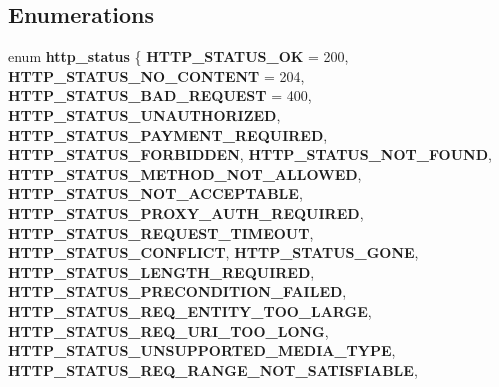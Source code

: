 \subsection*{Enumerations}
\begin{DoxyCompactItemize}
\item 
\mbox{\label{group__html-chunked-substitution_gabc3b93f68c8bdd857ad32913628dfa8d}} 
enum {\bfseries http\+\_\+status} \{ \newline
{\bfseries H\+T\+T\+P\+\_\+\+S\+T\+A\+T\+U\+S\+\_\+\+OK} = 200, 
{\bfseries H\+T\+T\+P\+\_\+\+S\+T\+A\+T\+U\+S\+\_\+\+N\+O\+\_\+\+C\+O\+N\+T\+E\+NT} = 204, 
{\bfseries H\+T\+T\+P\+\_\+\+S\+T\+A\+T\+U\+S\+\_\+\+B\+A\+D\+\_\+\+R\+E\+Q\+U\+E\+ST} = 400, 
{\bfseries H\+T\+T\+P\+\_\+\+S\+T\+A\+T\+U\+S\+\_\+\+U\+N\+A\+U\+T\+H\+O\+R\+I\+Z\+ED}, 
\newline
{\bfseries H\+T\+T\+P\+\_\+\+S\+T\+A\+T\+U\+S\+\_\+\+P\+A\+Y\+M\+E\+N\+T\+\_\+\+R\+E\+Q\+U\+I\+R\+ED}, 
{\bfseries H\+T\+T\+P\+\_\+\+S\+T\+A\+T\+U\+S\+\_\+\+F\+O\+R\+B\+I\+D\+D\+EN}, 
{\bfseries H\+T\+T\+P\+\_\+\+S\+T\+A\+T\+U\+S\+\_\+\+N\+O\+T\+\_\+\+F\+O\+U\+ND}, 
{\bfseries H\+T\+T\+P\+\_\+\+S\+T\+A\+T\+U\+S\+\_\+\+M\+E\+T\+H\+O\+D\+\_\+\+N\+O\+T\+\_\+\+A\+L\+L\+O\+W\+ED}, 
\newline
{\bfseries H\+T\+T\+P\+\_\+\+S\+T\+A\+T\+U\+S\+\_\+\+N\+O\+T\+\_\+\+A\+C\+C\+E\+P\+T\+A\+B\+LE}, 
{\bfseries H\+T\+T\+P\+\_\+\+S\+T\+A\+T\+U\+S\+\_\+\+P\+R\+O\+X\+Y\+\_\+\+A\+U\+T\+H\+\_\+\+R\+E\+Q\+U\+I\+R\+ED}, 
{\bfseries H\+T\+T\+P\+\_\+\+S\+T\+A\+T\+U\+S\+\_\+\+R\+E\+Q\+U\+E\+S\+T\+\_\+\+T\+I\+M\+E\+O\+UT}, 
{\bfseries H\+T\+T\+P\+\_\+\+S\+T\+A\+T\+U\+S\+\_\+\+C\+O\+N\+F\+L\+I\+CT}, 
\newline
{\bfseries H\+T\+T\+P\+\_\+\+S\+T\+A\+T\+U\+S\+\_\+\+G\+O\+NE}, 
{\bfseries H\+T\+T\+P\+\_\+\+S\+T\+A\+T\+U\+S\+\_\+\+L\+E\+N\+G\+T\+H\+\_\+\+R\+E\+Q\+U\+I\+R\+ED}, 
{\bfseries H\+T\+T\+P\+\_\+\+S\+T\+A\+T\+U\+S\+\_\+\+P\+R\+E\+C\+O\+N\+D\+I\+T\+I\+O\+N\+\_\+\+F\+A\+I\+L\+ED}, 
{\bfseries H\+T\+T\+P\+\_\+\+S\+T\+A\+T\+U\+S\+\_\+\+R\+E\+Q\+\_\+\+E\+N\+T\+I\+T\+Y\+\_\+\+T\+O\+O\+\_\+\+L\+A\+R\+GE}, 
\newline
{\bfseries H\+T\+T\+P\+\_\+\+S\+T\+A\+T\+U\+S\+\_\+\+R\+E\+Q\+\_\+\+U\+R\+I\+\_\+\+T\+O\+O\+\_\+\+L\+O\+NG}, 
{\bfseries H\+T\+T\+P\+\_\+\+S\+T\+A\+T\+U\+S\+\_\+\+U\+N\+S\+U\+P\+P\+O\+R\+T\+E\+D\+\_\+\+M\+E\+D\+I\+A\+\_\+\+T\+Y\+PE}, 
{\bfseries H\+T\+T\+P\+\_\+\+S\+T\+A\+T\+U\+S\+\_\+\+R\+E\+Q\+\_\+\+R\+A\+N\+G\+E\+\_\+\+N\+O\+T\+\_\+\+S\+A\+T\+I\+S\+F\+I\+A\+B\+LE}, 

\end{DoxyCompactItemize}

